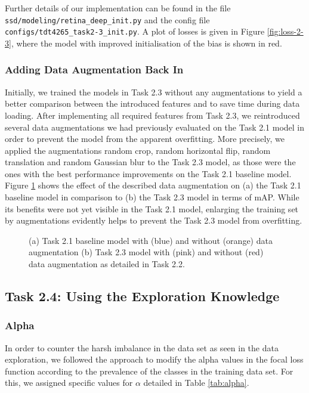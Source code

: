 \documentclass{article}
\begin{document}
Further details of our implementation can be found in the file \texttt{ssd/modeling/retina\_deep\_init.py} and the config file \texttt{configs/tdt4265\_task2-3\_init.py}. A plot of losses is given in Figure \ref{fig:loss-2-3}, where the model with improved initialisation of the bias is shown in red.


\subsubsection*{Adding Data Augmentation Back In}

Initially, we trained the models in Task 2.3 without any augmentations to yield a better comparison between the introduced features and to save time during data loading. After implementing all required features from Task 2.3, we reintroduced several data augmentations we had previously evaluated on the Task 2.1 model in order to prevent the model from the apparent overfitting. More precisely, we applied the augmentations random crop, random horizontal flip, random translation and random Gaussian blur to the Task 2.3 model, as those were the ones with the best performance improvements on the Task 2.1 baseline model. Figure \ref{fig:data_augment_comparison} shows the effect of the described data augmentation on (a) the Task 2.1 baseline model in comparison to (b) the Task 2.3 model in terms of mAP. While its benefits were not yet visible in the Task 2.1 model, enlarging the training set by augmentations evidently helps to prevent the Task 2.3 model from overfitting.

\begin{figure}[b!]
    \centering
    \subfigure[]{}
    \subfigure[]{}
    \caption{(a) Task 2.1 baseline model with (blue) and without (orange) data augmentation (b) Task 2.3 model with (pink) and without (red) data augmentation as detailed in Task 2.2.}
    \label{fig:data_augment_comparison}
\end{figure}


\newpage
\subsection*{Task 2.4: Using the Exploration Knowledge}

\subsubsection*{Alpha}
In order to counter the harsh imbalance in the data set as seen in the data exploration, we followed the approach to modify the alpha values in the focal loss function according to the prevalence of the classes in the training data set. For this, we assigned specific values for $\alpha$ detailed in Table \ref{tab:alpha}.
\end{document}

